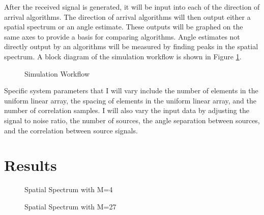 \documentclass[conference]{IEEEtran}
\begin{document}
		After the received signal is generated, it will be input into each of the direction of arrival algorithms. The direction of arrival algorithms will then output either a spatial spectrum or an angle estimate. These outputs will be graphed on the same axes to provide a basis for comparing algorithms. Angle estimates not directly output by an algorithms will be measured by finding peaks in the spatial spectrum. A block diagram of the simulation workflow is shown in Figure \ref{sim_workflow}.
		
		\begin{figure}[H]
			\centerline{}
			\caption{Simulation Workflow}
			\label{sim_workflow}
		\end{figure}
		
		Specific system parameters that I will vary include the number of elements in the uniform linear array, the spacing of elements in the uniform linear array, and the number of correlation samples. I will also vary the input data by adjusting the signal to noise ratio, the number of sources, the angle separation between sources, and the correlation between source signals.
		
	\section{Results}
	
		\begin{figure}[H]
			\centerline{}
			\caption{Spatial Spectrum with M=4}
		\end{figure}
		
		\begin{figure}[H]
			\centerline{}
			\caption{Spatial Spectrum with M=27}
		\end{figure}
\end{document}
